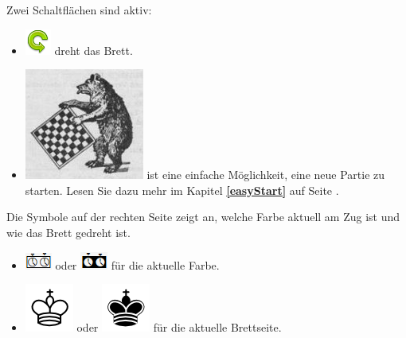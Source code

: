 \documentclass[11pt,a4paper]{article}
\begin{document}
	Zwei Schaltflächen sind aktiv:
	\begin{itemize}
		\item \includegraphics[scale=0.5]{arrow_rotate_anticlockwise.png} dreht das Brett.
		\item \includegraphics[scale=0.2]{bearchess_2.png} ist eine einfache Möglichkeit, eine neue Partie zu starten. Lesen Sie dazu mehr im Kapitel \textbf{\ref{easyStart}  } auf Seite \pageref{easyStart}.
	\end{itemize}
	Die Symbole auf der rechten Seite zeigt an, welche Farbe aktuell am Zug ist und wie das Brett gedreht ist.
	\begin{itemize}
		\item \includegraphics[scale=0.6]{WhiteClock.png} oder \includegraphics[scale=0.6]{BlackClock.png} für die aktuelle Farbe.
		\item \includegraphics[scale=0.3]{KingW.png}  oder \includegraphics[scale=0.3]{KingB.png} für die aktuelle Brettseite. 
	\end{itemize}
	
	
\end{document}
